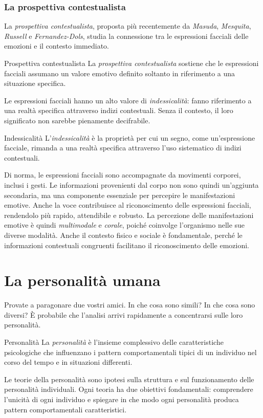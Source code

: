 \documentclass[a4paper]{article}
\begin{document}
\subsubsection{La prospettiva contestualista}
La \emph{prospettiva contestualista}, proposta più recentemente da \emph{Masuda}, \emph{Mesquita}, \emph{Russell} e \emph{Fernandez-Dols}, studia la connessione tra le espressioni facciali delle emozioni e il contesto immediato.
\begin{snippetdefinition}{Prospettiva contestualista}
    La \emph{prospettiva contestualista} sostiene che le espressioni facciali assumano un valore emotivo definito soltanto in riferimento a una situazione specifica.
\end{snippetdefinition}
Le espressioni facciali hanno un alto valore di \emph{indessicalità}: fanno riferimento a una realtà specifica attraverso indizi contestuali. Senza il contesto, il loro significato non sarebbe pienamente decifrabile.
\begin{snippetdefinition}{Indessicalità}
    L'\emph{indessicalità} è la proprietà per cui un segno, come un'espressione facciale, rimanda a una realtà specifica attraverso l'uso sistematico di indizi contestuali.
\end{snippetdefinition}
Di norma, le espressioni facciali sono accompagnate da movimenti corporei, inclusi i gesti. Le informazioni provenienti dal corpo non sono quindi un'aggiunta secondaria, ma una componente essenziale per percepire le manifestazioni emotive. Anche la voce contribuisce al riconoscimento delle espressioni facciali, rendendolo più rapido, attendibile e robusto.
La percezione delle manifestazioni emotive è quindi \emph{multimodale} e \emph{corale}, poiché coinvolge l'organismo nelle sue diverse modalità. Anche il contesto fisico e sociale è fondamentale, perché le informazioni contestuali congruenti facilitano il riconoscimento delle emozioni.
\section{La personalità umana}
Provate a paragonare due vostri amici. In che cosa sono simili? In che cosa sono diversi? È probabile che l'analisi arrivi rapidamente a concentrarsi sulle loro personalità.
\begin{snippetdefinition}{Personalità}
    La \emph{personalità} è l'insieme complessivo delle caratteristiche psicologiche che influenzano i pattern comportamentali tipici di un individuo nel corso del tempo e in situazioni differenti.
\end{snippetdefinition}
Le teorie della personalità sono ipotesi sulla struttura e sul funzionamento delle personalità individuali. Ogni teoria ha due obiettivi fondamentali: comprendere l'unicità di ogni individuo e spiegare in che modo ogni personalità produca pattern comportamentali caratteristici.
\end{document}
